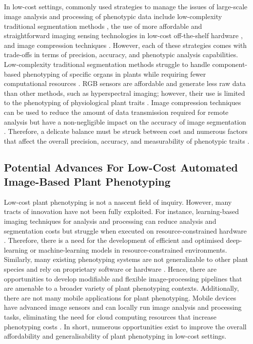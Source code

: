 \subparagraph{}
In low-cost settings, commonly used strategies to manage the issues of large-scale image analysis and processing of phenotypic data include low-complexity traditional segmentation methods \cite{minerviniImageAnalysisNew2015}, the use of more affordable and straightforward imaging sensing technologies in low-cost off-the-shelf hardware \cite{tovarRaspberryPiPowered2018a}, and image compression techniques \cite{minerviniApplicationawareImageCompression2013}. However, each of these strategies comes with trade-offs in terms of precision, accuracy, and phenotypic analysis capabilities. Low-complexity traditional segmentation methods struggle to handle component-based phenotyping of specific organs in plants while requiring fewer computational resources \cite{choudhurySegmentationTechniquesChallenges2020}. RGB sensors are affordable and generate less raw data than other methods, such as hyperspectral imaging; however, their use is limited to the phenotyping of physiological plant traits \cite{liReviewImagingTechniques2014}. Image compression techniques can be used to reduce the amount of data transmission required for remote analysis but have a non-negligible impact on the accuracy of image segmentation \cite{minerviniApplicationawareImageCompression2013}. Therefore, a delicate balance must be struck between cost and numerous factors that affect the overall precision, accuracy, and measurability of phenotypic traits \cite{muller-linowPlantScreenMobile2019}.

\subsection{Potential Advances For Low-Cost Automated Image-Based Plant Phenotyping}
Low-cost plant phenotyping is not a nascent field of inquiry. However, many tracts of innovation have not been fully exploited. For instance, learning-based imaging techniques for analysis and processing can reduce analysis and segmentation costs but struggle when executed on resource-constrained hardware \cite{nabwireReviewApplicationArtificial2021}. Therefore, there is a need for the development of efficient and optimised deep-learning or machine-learning models in resource-constrained environments. Similarly, many existing phenotyping systems are not generalizable to other plant species \cite{liReviewImagingTechniques2014, arvidssonGrowthPhenotypingPipeline2011a} and rely on proprietary software or hardware \cite{czedik-eysenbergPhenoBoxFlexibleAutomated2018}. Hence, there are opportunities to develop modifiable and flexible image-processing pipelines that are amenable to a broader variety of plant phenotyping contexts. Additionally, there are not many mobile applications for plant phenotyping. Mobile devices have advanced image sensors and can locally run image analysis and processing tasks, eliminating the need for cloud computing resources that increase phenotyping costs \cite{muller-linowPlantScreenMobile2019}. In short, numerous opportunities exist to improve the overall affordability and generalisability of plant phenotyping in low-cost settings.